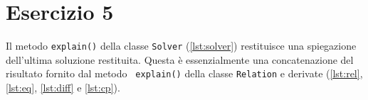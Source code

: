 \section{Esercizio 5}

Il metodo {\tt explain()} della classe {\tt Solver} (\autoref{lst:solver})
restituisce una spiegazione dell'ultima soluzione restituita. Questa è
essenzialmente una concatenazione del risultato fornito dal metodo {\tt
explain()} della classe {\tt Relation} e derivate (\autoref{lst:rel},
\ref{lst:eq}, \ref{lst:diff} e \ref{lst:cp}).
